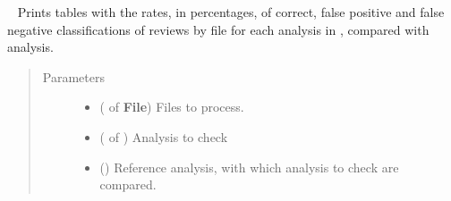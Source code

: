 \documentclass[letterpaper,10pt,english]{sphinxmanual}
\begin{document}
\label{\detokenize{analysis:module-loacore.analysis.polarity_check}}

\begin{fulllineitems}
\label{\detokenize{analysis:loacore.analysis.polarity_check.check_polarity}}~
Prints tables with the rates, in percentages, of correct, false positive and false negative classifications of
reviews by file for each analysis in , compared with  analysis.
\begin{quote}\begin{description}
\item[{Parameters}] \leavevmode\begin{itemize}
\item {} 
 ( of {\color{red}\bfseries{}\textbar{}File\textbar{}}) \textendash{} Files to process.

\item {} 
 ( of ) \textendash{} Analysis to check

\item {} 
 () \textendash{} Reference analysis, with which analysis to check are compared.

\end{itemize}

\end{description}\end{quote}

\end{fulllineitems}

\end{document}
